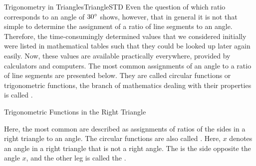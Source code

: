 \begin{MXContent}{Trigonometry in Triangles}{Triangle}{STD}
Even the question of which ratio corresponds to an angle of $30^{\circ}$ shows, however,
that in general it is not that simple to determine the assignment of a ratio
of line segments to an angle.
Therefore, the time-consumingly determined values that we considered initially
were listed in mathematical tables such that they could be looked up later again easily.
Now, these values are available practically everywhere, provided by calculators and 
computers. The most common assignments of an angle to a ratio of line segments are presented 
below. They are called circular functions or trigonometric functions, 
the branch of mathematics dealing with their properties is called 
.


\begin{MXInfo}{Trigonometric Functions in the Right Triangle}%
%

Here, the most common 
are described as assignments of ratios of the sides in a right triangle to an angle. 
The circular functions are also called .
Here, $x$ denotes an angle in a right triangle that is not a right angle.
The  is the side opposite the angle $x$, 
and the other leg is called the . 

\begin{center}
\end{center}


\end{MXInfo}
\end{MXContent}
